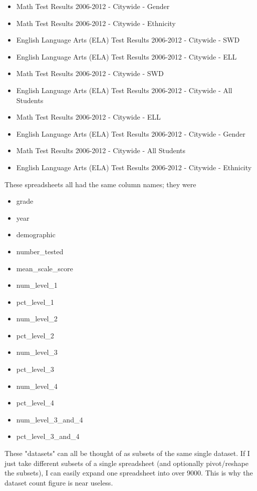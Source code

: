 \documentclass{acm_proc_article-sp}
\begin{document}
\begin{itemize}
\item Math Test Results 2006-2012 - Citywide - Gender
\item Math Test Results 2006-2012 - Citywide - Ethnicity
\item English Language Arts (ELA) Test Results 2006-2012 - Citywide - SWD
\item English Language Arts (ELA) Test Results 2006-2012 - Citywide - ELL
\item Math Test Results 2006-2012 - Citywide - SWD
\item English Language Arts (ELA) Test Results 2006-2012 - Citywide - All Students
\item Math Test Results 2006-2012 - Citywide - ELL
\item English Language Arts (ELA) Test Results 2006-2012 - Citywide - Gender
\item Math Test Results 2006-2012 - Citywide - All Students
\item English Language Arts (ELA) Test Results 2006-2012 - Citywide - Ethnicity
\end{itemize}

These spreadsheets all had the same column names; they were

\begin{itemize}
\item grade
\item year
\item demographic
\item number_tested
\item mean_scale_score
\item num_level_1
\item pct_level_1
\item num_level_2
\item pct_level_2
\item num_level_3
\item pct_level_3
\item num_level_4
\item pct_level_4
\item num_level_3_and_4
\item pct_level_3_and_4
\end{itemize}

These "datasets" can all be thought of as subsets of the same single dataset.
If I just take different subsets of a single spreadsheet (and optionally
pivot/reshape the subsets), I can easily expand one spreadsheet into over 9000.
This is why the dataset count figure is near useless.
\end{document}
